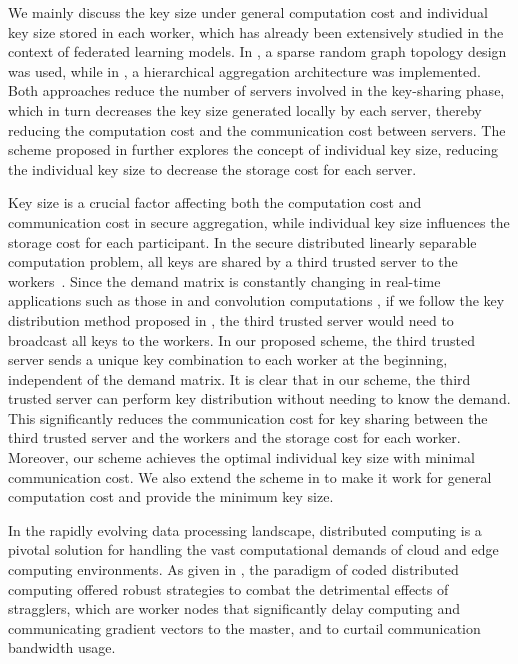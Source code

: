 \documentclass[conference,letterpaper]{IEEEtran}
\begin{document}
We mainly discuss the key size under general computation cost and individual key size stored in each worker, which has already been extensively studied in the context of federated learning models. In \cite{choi2020communication}, a sparse random graph topology design was used, while in \cite{jahani2022swiftagg}, a hierarchical aggregation architecture was implemented. Both approaches reduce the number of servers involved in the key-sharing phase, which in turn decreases the key size generated locally by each server, thereby reducing the computation cost and the communication cost between servers. The scheme proposed in \cite{zhao2022information} further explores the concept of individual key size, reducing the individual key size to decrease the storage cost for each server. 
\fi

Key size is a crucial factor affecting both the computation cost and communication cost in secure aggregation, while individual key size influences the storage cost for each participant.
In the secure distributed linearly separable computation problem, all keys are shared by a third trusted server to the workers~\cite{wan2022secure}. Since the demand matrix is constantly changing in real-time applications such as those in \cite{Yu_2021_ICCV} and convolution computations \cite{cong2014minimizing}, if we follow the key distribution method proposed in \cite{wan2022secure}, the third trusted server would need to broadcast all keys to the workers. In our proposed scheme, the third trusted server sends a unique key combination to each worker at the beginning, independent of the demand matrix. It is clear that in our scheme, the third trusted server can perform key distribution without needing to know the demand.
This significantly reduces the communication cost for key sharing between the third trusted server and the workers and the storage cost for each worker.
 Moreover, our scheme achieves the optimal individual key size with minimal communication cost. We also extend the scheme in \cite{wan2022secure} to make it work for general computation cost and provide the minimum key size.



\iffalse
In the rapidly evolving data processing landscape, distributed computing is a pivotal solution for handling the vast computational demands of cloud and edge computing environments. As given in \cite{Speeding_Up_Distributed}, the paradigm of coded distributed computing offered robust strategies to combat the detrimental effects of stragglers, which are worker nodes that significantly delay computing and communicating gradient vectors to the master, and to curtail communication bandwidth usage.
\end{document}
